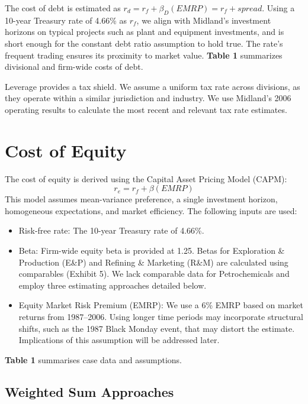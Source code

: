 \documentclass[AER]{AEA}
\begin{document}
\begin{spacing}{1.5}
The cost of debt is estimated as $r_d=r_f + \beta_D(EM\!RP) = r_f+spread$.  Using a 10-year Treasury rate of 4.66\% as $r_f$, we align with Midland’s investment horizons on typical projects such as plant and equipment investments, and is short enough for the constant debt ratio assumption to hold true. The rate's frequent trading ensures its proximity to market value. \textbf{Table 1} summarizes divisional and firm-wide costs of debt.

Leverage provides a tax shield. We assume a uniform tax rate across divisions, as they operate within a similar jurisdiction and industry. We use Midland’s 2006 operating results to calculate the most recent and relevant tax rate estimates.

\section{Cost of Equity}

The cost of equity is derived using the Capital Asset Pricing Model (CAPM):\begin{equation}
    r_e=r_f+\beta(EMRP)
\end{equation} This model assumes mean-variance preference, a single investment horizon, homogeneous expectations, and market efficiency. The following inputs are used:

\begin{itemize}
    \item Risk-free rate: The 10-year Treasury rate of 4.66\%.
    \item Beta: Firm-wide equity beta is provided at 1.25. Betas for Exploration \& Production (E\&P) and Refining \& Marketing (R\&M) are calculated using comparables (Exhibit 5). We lack comparable data for Petrochemicals and employ three estimating approaches detailed below.
    \item Equity Market Risk Premium (EMRP): We use a 6\% EMRP based on market returns from 1987–2006. Using longer time periods may incorporate structural shifts, such as the 1987 Black Monday event, that may distort the estimate. Implications of this assumption will be addressed later.
\end{itemize}

\textbf{Table 1} summarises case data and assumptions.

\subsection{Weighted Sum Approaches}


\end{spacing}
\end{document}
